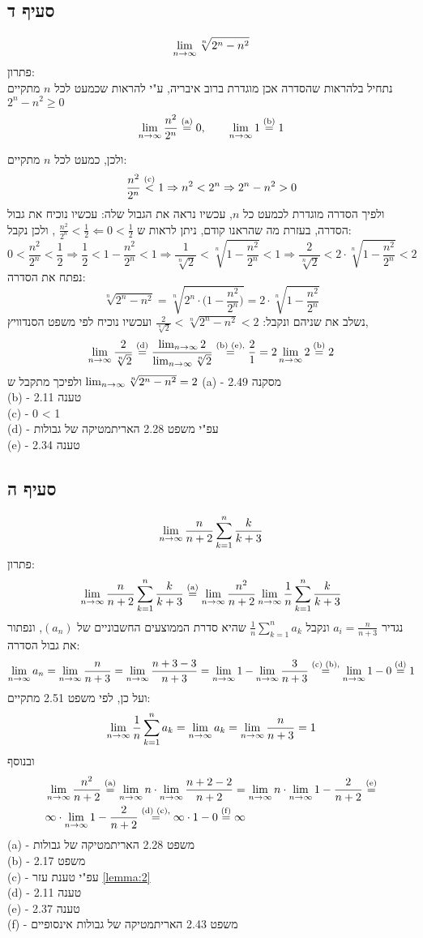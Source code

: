 \documentclass{article}
\begin{document}
\subsection*{סעיף ד}
\[ \lim_{n \to \infty} \sqrt[n]{2^n - n^2} \]
פתרון: \\
נתחיל בלהראות שהסדרה אכן מוגדרת ברוב איבריה, ע"י להראות שכמעט לכל $n$ מתקיים $2^n - n^2 \geq 0$
\[
	\lim_{n \to \infty} \frac{n^2}{2^n} \overset{\text{(a)}}= 0, \qquad
	\lim_{n \to \infty} 1 \overset{\text{(b)}}= 1
\]

ולכן, כמעט לכל $n$ מתקיים:
\[
	\frac{n^2}{2^n} \overset{\text{(c)}} < 1 \Rightarrow
	n^2 < 2^n \Rightarrow
	2^n - n^2 > 0
\]
ולפיך הסדרה מוגדרת לכמעט כל $n$, עכשיו נראה את הגבול שלה:
עכשיו נוכיח את גבול הסדרה, בעזרת מה שהראנו קודם, ניתן לראות ש
$\frac{n^2}{2^n} < \frac{1}{2} \Leftarrow 0 < \frac{1}{2}$
, ולכן נקבל:
\[
 	0 < \frac{n^2}{2^n} < \frac{1}{2} \Rightarrow
	\frac{1}{2} < 1 - \frac{n^2}{2^n} < 1 \Rightarrow
	\frac{1}{\sqrt[n]{2}} < \sqrt[n]{1 - \frac{n^2}{2^n}} < 1 \Rightarrow
	\frac{2}{\sqrt[n]{2}} < 2 \cdot \sqrt[n]{1 - \frac{n^2}{2^n}} < 2
\]
נפתח את הסדרה:
\[
	\sqrt[n]{2^n - n^2} =
	\sqrt[n]{2^n \cdot \Big( 1 - \frac{n^2}{2^n} \Big)} =
	2 \cdot \sqrt[n]{1 - \frac{n^2}{2^n}}
\]
נשלב את שניהם ונקבל:
$\frac{2}{\sqrt[n]{2}} < \sqrt[n]{2^n - n^2} < 2$
ועכשיו נוכיח לפי משפט הסנדוויץ,
\[
	\lim_{n \to \infty} \frac{2}{\sqrt[n]{2}} \overset{\text{(d)}} =
	\frac{\lim_{n \to \infty} 2}{\lim_{n \to \infty} \sqrt[n]{2}} \overset{\text{(b) (e),}} =
	\frac{2}{1} = 2 \\
	\lim_{n \to \infty} 2 \overset{\text{(b)}} = 2
\]
ולפיכך מתקבל ש $\lim_{n \to \infty} \sqrt[n]{2^n - n^2} = 2$
(a) -
מסקנה 2.49 \\
(b) -
טענה 2.11 \\
(c) - 0 < 1 \\
(d) -
עפ"י משפט 2.28 האריתמטיקה של גבולות \\
(e) -
טענה 2.34

\subsection*{סעיף ה}
\[ \lim_{n \to \infty} \frac{n}{n+2} \sum_{k=1}^n \frac{k}{k+3} \]
פתרון:
\[
	\lim_{n \to \infty} \frac{n}{n+2} \sum_{k=1}^n \frac{k}{k+3} \overset{\text{(a)}}=
	\lim_{n \to \infty}\frac{n^2}{n+2}  \lim_{n \to \infty} \frac{1}{n} \sum_{k=1}^n \frac{k}{k+3}
\]
נגדיר $a_i = \frac{n}{n+3}$ ונקבל $\frac{1}{n}\sum_{k=1}^n a_k$ שהיא סדרת הממוצעים החשבוניים של $(a_n)$,
ונפתור את גבול הסדרה:
\[
 \lim_{n \to \infty} a_n =
 \lim_{n \to \infty} \frac{n}{n+3} =
 \lim_{n \to \infty} \frac{n + 3 - 3}{ n +3} =
 \lim_{n \to \infty} 1 - \lim_{n \to \infty} \frac{3}{n+3}  \overset{\text{(c) (b),}}=
 \lim_{n \to \infty} 1  - 0 \overset{\text{(d)}}= 1
\]
ועל כן, לפי משפט 2.51 מתקיים:
\[
	\lim_{n \to \infty} \frac{1}{n}\sum_{k=1}^n a_k =
	\lim_{n \to \infty} a_k =
	\lim_{n \to \infty} \frac{n}{n+3} = 1
\]
ובנוסף
\begin{align*}
	&\lim_{n \to \infty}\frac{n^2}{n+2} \overset{\text{(a)}}=
	\lim_{n \to \infty} n \cdot \lim_{n \to \infty} \frac{n + 2 -2}{n+2} =
	\lim_{n \to \infty} n \cdot \lim_{n \to \infty} 1 - \frac{2}{n+2} \overset{\text{(e)}}= \\
	&\infty \cdot \lim_{n \to \infty} 1 - \frac{2}{n+2} \overset{\text{(d) (c),}}=
	\infty \cdot 1 - 0 \overset{\text{(f)}}= \infty
\end{align*}
(a) -
 משפט 2.28 האריתמטיקה של גבולות \\
(b) -
משפט 2.17 \\
(c) -
עפ"י טענת עזר \ref{lemma:2} \\
(d) -
טענה 2.11 \\
(e) -
טענה 2.37 \\
(f) -
משפט 2.43 האריתמטיקה של גבולות אינסופיים
\end{document}

